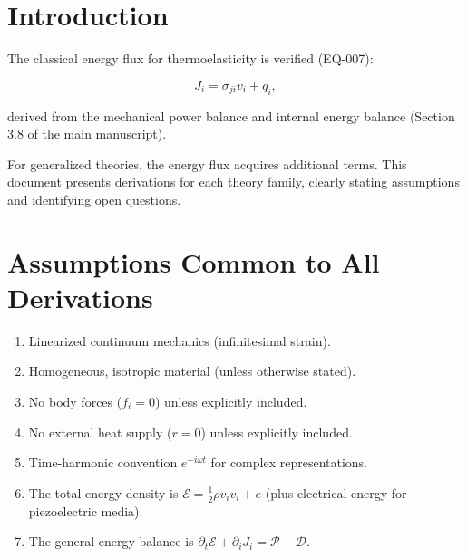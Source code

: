 %

\section{Introduction}

The classical energy flux for thermoelasticity is verified (EQ-007):

\begin{equation}
J_i = \sigma_{ji}v_i + q_i,
\label{ef:classical}
\end{equation}

derived from the mechanical power balance and internal energy balance (Section 3.8 of the main manuscript).

For generalized theories, the energy flux acquires additional terms. This document presents derivations for each theory family, clearly stating assumptions and identifying open questions.

\section{Assumptions Common to All Derivations}

\begin{enumerate}
\item Linearized continuum mechanics (infinitesimal strain).
\item Homogeneous, isotropic material (unless otherwise stated).
\item No body forces ($f_i = 0$) unless explicitly included.
\item No external heat supply ($r = 0$) unless explicitly included.
\item Time-harmonic convention $e^{-i\omega t}$ for complex representations.
\item The total energy density is $\mathcal{E} = \frac{1}{2}\rho v_i v_i + e$ (plus electrical energy for piezoelectric media).
\item The general energy balance is $\partial_t\mathcal{E} + \partial_i J_i = \mathcal{P} - \mathcal{D}$.
\end{enumerate}

